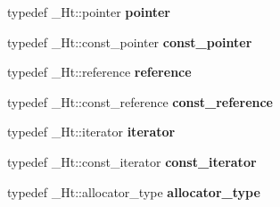 \begin{DoxyCompactItemize}
typedef \+\_\+\+Ht\+::pointer {\bfseries pointer}
\item 
\mbox{\label{classhash__set_acfb640604609cf5d6aed50fed0363741}} 
typedef \+\_\+\+Ht\+::const\+\_\+pointer {\bfseries const\+\_\+pointer}
\item 
\mbox{\label{classhash__set_a79de1fcbc69822fed3a64bbfa70b5244}} 
typedef \+\_\+\+Ht\+::reference {\bfseries reference}
\item 
\mbox{\label{classhash__set_a3617f4c2109d0bd6aaf660f7b9cbfa78}} 
typedef \+\_\+\+Ht\+::const\+\_\+reference {\bfseries const\+\_\+reference}
\item 
\mbox{\label{classhash__set_aed75be78f01bcc8d7f73f57059d12e22}} 
typedef \+\_\+\+Ht\+::iterator {\bfseries iterator}
\item 
\mbox{\label{classhash__set_a866f52a39a0136868dc624dab72e1b7d}} 
typedef \+\_\+\+Ht\+::const\+\_\+iterator {\bfseries const\+\_\+iterator}
\item 
\mbox{\label{classhash__set_aeebf5c8dfc8b2d063262f13b89d4166e}} 
typedef \+\_\+\+Ht\+::allocator\+\_\+type {\bfseries allocator\+\_\+type}
\end{DoxyCompactItemize}
